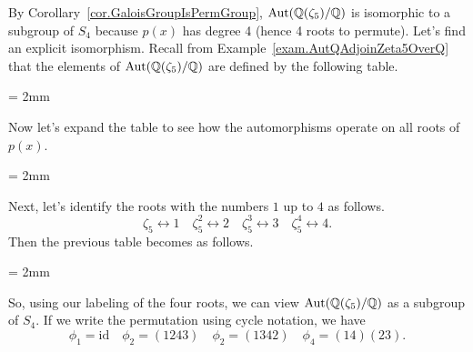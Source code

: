 \begin{example}
By Corollary~\ref{cor.GaloisGroupIsPermGroup}, $\operatorname{Aut}(\mathbb{Q}(\zeta_5)/\mathbb{Q})$ is isomorphic to a subgroup of $S_4$ because $p(x)$ has degree 4 (hence 4 roots to permute). Let's find an explicit isomorphism. Recall from Example~\ref{exam.AutQAdjoinZeta5OverQ} that the elements of $\operatorname{Aut}(\mathbb{Q}(\zeta_5)/\mathbb{Q})$ are defined by the following table.
\begin{center}
\tabulinesep = 2mm
\end{center}
Now let's expand the table to see how the automorphisms operate on all roots of $p(x)$.
\begin{center}
\tabulinesep = 2mm
\end{center}
Next, let's identify the roots with the numbers $1$ up to $4$ as follows.
\[\zeta_5 \leftrightarrow 1\quad \zeta_5^2 \leftrightarrow 2 \quad \zeta_5^3 \leftrightarrow 3 \quad \zeta_5^4 \leftrightarrow 4.\]
Then the previous table becomes as follows.
\begin{center}
\tabulinesep = 2mm
\end{center}
So, using our labeling of the four roots, we can view $\operatorname{Aut}(\mathbb{Q}(\zeta_5)/\mathbb{Q})$ as a subgroup of $S_4$. If we write the permutation using cycle notation, we have 
\[\phi_1 = \text{id} \quad \phi_2 = (1243) \quad \phi_2 = (1342) \quad \phi_4 = (14)(23).\]
\end{example}

